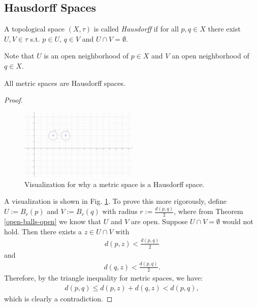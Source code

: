 \subsection{Hausdorff Spaces}

\begin{defn}[Hausdorff]
	A topological space $\left(X, \tau\right)$ is called \textit{Hausdorff} if for all $p, q\in X$ there exist $U, V\in \tau$ s.t. $p\in U$, $q\in V$ and $U\cap V = \emptyset$.  
\end{defn} 

\begin{remark}
	Note that $U$ is an open neighborhood of $p\in X$ and $V$ an open neighborhood of $q\in X$.
\end{remark}

\begin{theorem}
	All metric spaces are Hausdorff spaces. 
\end{theorem}

\begin{proof}
	\begin{figure}[h!]		
		\centering 
		\includegraphics[trim = {3.8cm 5.8cm 9.7cm 2.8cm}, width=0.5\textwidth, clip]{Figures/metric-spaces-Hausdorff-spaces-v2.png}
		\caption{Visualization for why a metric space is a Hausdorff space.}
		\label{metric-space-Hausdorff-space}
	\end{figure} 
	A visualization is shown in Fig. \ref{metric-space-Hausdorff-space}. To prove this more rigorously, define $U := B_{r}(p)$ and $V:=B_{r}(q)$ with radius $r := \frac{d(p, q)}{2}$, where from Theorem \ref{open-balls-open} we know that $U$ and $V$ are open. Suppose $U\cap V = \emptyset$ would not hold. Then there exists a $z\in U\cap V$ with 
	\begin{align}
		d(p, z) < \frac{d(p, q)}{2}
	\end{align}
	and 
	\begin{align}
		d(q, z) < \frac{d(p, q)}{2}. 
	\end{align}
	Therefore, by the triangle inequality for metric spaces, we have: 
	\begin{align}
		d(p, q) \leq d(p, z) + d(q, z) < d(p, q), 
	\end{align}
	which is clearly a contradiction. 
\end{proof}


